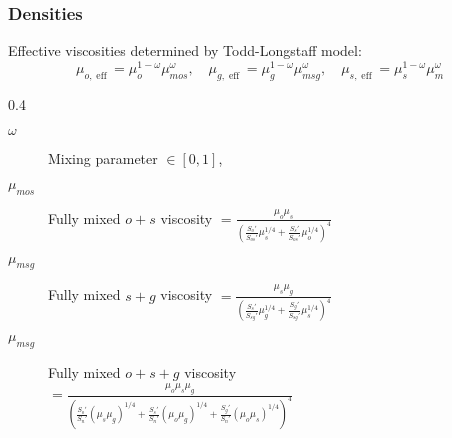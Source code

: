 \documentclass[screen, aspectratio=43]{beamer}
\DeclareMathOperator{\eff}{eff}
\begin{document}
\begin{frame}
  \frametitle{Densities}
  \vspace{0.2cm}
  Effective viscosities determined by Todd-Longstaff model:
  \begin{equation*}
    \mu_{o, \eff} = \mu_o^{1-\omega}\mu_{mos}^\omega, \quad
    \mu_{g, \eff} = \mu_g^{1-\omega}\mu_{msg}^\omega, \quad
    \mu_{s, \eff} = \mu_s^{1-\omega}\mu_{m}^\omega
  \end{equation*}
  \vspace{0.2cm}
  \begin{mybox}{}{0.4\textheight}
    \begin{description}
    \item[$\omega$] Mixing parameter $\in [0,1]$,
    \item[$\mu_{mos}$] Fully mixed $o + s$ viscosity
      $= \frac{\mu_o \mu_s}{\left(\frac{S_o'}{S_{os}'}\mu_s^{1/4} +
          \frac{S_s'}{S_{os}'}\mu_o^{1/4}\right)^4}$
    \item[$\mu_{msg}$] Fully mixed $s + g$ viscosity
      $ = \frac{\mu_s \mu_g}{\left(\frac{S_s'}{S_{sg}'}\mu_g^{1/4} +
          \frac{S_g'}{S_{sg}'}\mu_s^{1/4}\right)^4}$
    \item[$\mu_{msg}$] Fully mixed $o +s + g$ viscosity \\
      \hfill $ = \frac{\mu_o \mu_s \mu_g}{\left(\frac{S_o'}{S_{n}'}(\mu_s\mu_g)^{1/4}
          + \frac{S_s'}{S_{n}'}(\mu_o\mu_g)^{1/4}
          + \frac{S_g'}{S_{n}'}(\mu_o\mu_s)^{1/4}\right)^4}$
    \end{description}
  \end{mybox}

\end{frame}
\end{document}
